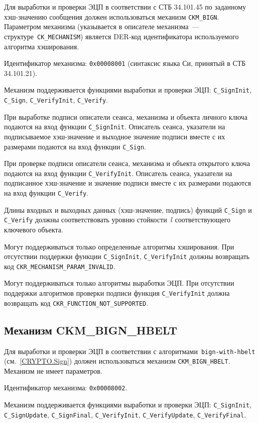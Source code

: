 Для выработки и проверки ЭЦП в соответствии с СТБ 34.101.45 по 
заданному хэш-значению сообщения должен использоваться механизм 
\verb|CKM_BIGN|. 
%
Параметром механизма (указывается в описателе механизма~--- 
структуре~\verb|CK_MECHANISM|) является DER-код идентификатора 
используемого алгоритма хэширования.

Идентификатор механизма: \texttt{0x00008001} 
(синтаксис языка Си, принятый в СТБ 34.101.21). 

Механизм поддерживается функциями выработки и проверки ЭЦП: 
\verb|C_SignInit|, \verb|C_Sign|, \verb|C_VerifyInit|, \verb|C_Verify|.

При выработке подписи описатели сеанса, механизма и объекта
личного ключа подаются на вход функции \verb|C_SignInit|.
Описатель сеанса, указатели на подписываемое хэш-значение и выходное 
значение подписи вместе с их размерами подаются на вход функции 
\verb|C_Sign|.

При проверке подписи описатели сеанса, механизма и объекта
открытого ключа подаются на вход функции \verb|C_VerifyInit|.
Описатель сеанса, указатели на подписанное хэш-значение и значение подписи 
вместе с их размерами подаются на вход функции \verb|C_Verify|.

Длины входных и выходных данных (хэш-значение, подпись) функций
\verb|C_Sign| и \verb|C_Verify| должны соответствовать
уровню стойкости~$l$ соответствующего ключевого объекта.

Могут поддерживаться только определенные алгоритмы хэширования.
При отсутствии поддержки функции \verb|C_SignInit|,
\verb|C_VerifyInit| должны возвращать код 
\verb|CKR_MECHANISM_PARAM_INVALID|.

Могут поддерживаться только алгоритмы выработки ЭЦП.
При отсутствии поддержки алгоритмов проверки подписи
функция \verb|C_VerifyInit| должна возвращать код 
\verb|CKR_FUNCTION_NOT_SUPPORTED|.

\subsection{Механизм CKM\_BIGN\_HBELT}\label{CRYPTOKI.SignHBelt}

Для выработки и проверки ЭЦП в соответствии с 
алгоритмами~\texttt{bign-with-hbelt} (см.~\ref{CRYPTO.Sign}) должен 
использоваться механизм \verb|CKM_BIGN_HBELT|.
%
Механизм не имеет параметров.

Идентификатор механизма: \texttt{0x00008002}.

Механизм поддерживается функциями выработки и проверки ЭЦП: 
\verb|C_SignInit|, \verb|C_SignUpdate|, \verb|C_SignFinal|, 
\verb|C_VerifyInit|, \verb|C_VerifyUpdate|, \verb|C_VerifyFinal|.

